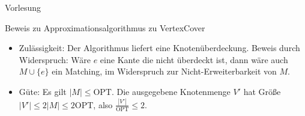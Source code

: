\begin{section}{Vorlesung}
 \begin{subsection}{Beweis zu Approximationsalgorithmus zu VertexCover}
 \begin{itemize}
  \item Zulässigkeit: Der Algorithmus liefert eine Knotenüberdeckung. Beweis durch Widerspruch: Wäre $e$ eine Kante die nicht überdeckt ist, dann wäre auch $M\cup\{e\}$ ein Matching, im Widerspruch zur Nicht-Erweiterbarkeit von $M$.
  \item Güte: Es gilt $|M|\leq\text{OPT}$. Die ausgegebene Knotenmenge $V'$ hat Größe $|V'|\leq2|M|\leq2\text{OPT}$, also $\frac{|V'|}{\text{OPT}}\leq2$.
 \end{itemize}
 \end{subsection}
\end{section}

